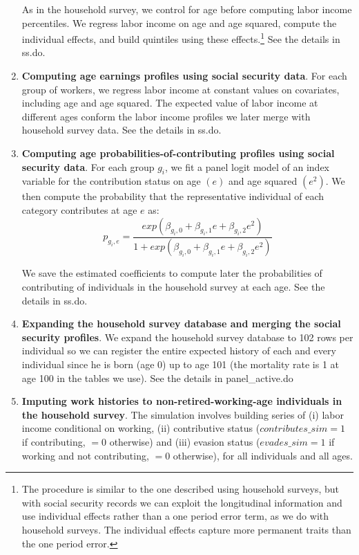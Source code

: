 \documentclass{article}
\begin{document}
\begin{enumerate}
    As in the household survey, we control for age before computing labor income percentiles. We regress labor income on age and age squared, compute the individual effects, and build quintiles using these  effects.\footnote{The procedure is similar to the one described using household surveys, but with social security records we can exploit the longitudinal information and use individual effects rather than a one period error term, as we do with household surveys. The individual effects capture more permanent traits than the one period error. }  See the details in ss.do.    
    
    \item \label{item:income-profile} \textbf{Computing age earnings profiles using social security data}. For each group of workers, we regress labor income at constant values on covariates, including age and age squared. The expected value of labor income at different ages conform the labor income profiles we later merge with household survey data. See the details in ss.do.  
    
    \item \label{item:contributing-profile} \textbf{Computing age probabilities-of-contributing profiles using social security data}. For each group $g_i$, we fit a panel logit model of an index variable for the contribution status on age $(e)$ and age squared $(e^2)$. We then compute the probability that the representative individual of each category  contributes at age $e$ as:
    \begin{equation} \label{eq:pie} p_{g_i,e}=\frac{exp(\beta_{g_i,0} +\beta_{g_i,1} e+\beta_{g_i,2} e^2)}{1+ exp(\beta_{g_i,0} +\beta_{g_i,1} e+\beta_{g_i,2} e^2)} \end{equation} 
    
    We save the estimated coefficients to compute later the probabilities of contributing of individuals in the household survey at each age. See the details in ss.do. 
    
    \item \textbf{Expanding the household survey database and merging the social security profiles}. We expand the household survey database to 102 rows per individual so we can register the entire expected history of each and every individual since he is born (age 0) up to age 101 (the mortality rate is 1 at age 100 in the tables we use). See the details in panel\_active.do 
    
    \item \label{imputing-wh1} \textbf{Imputing work histories to non-retired-working-age individuals in the household survey}. The simulation involves building series of (i) labor income conditional on working, (ii) contributive status ($contributes\_sim =1$ if contributing, $=0$ otherwise) and (iii) evasion status ($evades\_sim = 1$ if working and not contributing, $=0$ otherwise), for all individuals and all ages. 
    

\end{enumerate}
\end{document}
